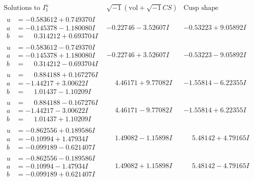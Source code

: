 \documentclass[1p]{elsarticle_modified}
\theoremstyle{definition}
\newcommand{\I}{\sqrt{-1}}
\begin{document}
$$\begin{array}{c|c|c}  
\text{Solutions to }I^u_{1}& \I (\text{vol} + \sqrt{-1}CS) & \text{Cusp shape}\\
 \hline 
\begin{aligned}
u &= -0.583612 + 0.749370 I \\
a &= -0.145378 - 1.180080 I \\
b &= \phantom{-}0.314212 + 0.693704 I\end{aligned}
 & -0.22746 - 3.52607 I & -0.53223 + 9.05892 I \\ \hline\begin{aligned}
u &= -0.583612 - 0.749370 I \\
a &= -0.145378 + 1.180080 I \\
b &= \phantom{-}0.314212 - 0.693704 I\end{aligned}
 & -0.22746 + 3.52607 I & -0.53223 - 9.05892 I \\ \hline\begin{aligned}
u &= \phantom{-}0.884188 + 0.167276 I \\
a &= -1.44217 + 3.00622 I \\
b &= \phantom{-}1.01437 - 1.10209 I\end{aligned}
 & \phantom{-}4.46171 + 9.77082 I & -1.55814 - 6.22355 I \\ \hline\begin{aligned}
u &= \phantom{-}0.884188 - 0.167276 I \\
a &= -1.44217 - 3.00622 I \\
b &= \phantom{-}1.01437 + 1.10209 I\end{aligned}
 & \phantom{-}4.46171 - 9.77082 I & -1.55814 + 6.22355 I \\ \hline\begin{aligned}
u &= -0.862556 + 0.189586 I \\
a &= -0.10994 + 1.47934 I \\
b &= -0.099189 - 0.621407 I\end{aligned}
 & \phantom{-}1.49082 - 1.15898 I & \phantom{-}5.48142 + 4.79165 I \\ \hline\begin{aligned}
u &= -0.862556 - 0.189586 I \\
a &= -0.10994 - 1.47934 I \\
b &= -0.099189 + 0.621407 I\end{aligned}
 & \phantom{-}1.49082 + 1.15898 I & \phantom{-}5.48142 - 4.79165 I \\ \hline\begin{aligned}

\end{aligned}
\end{array}$$
\end{document}
